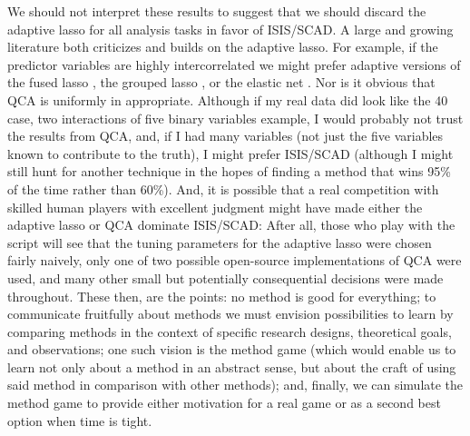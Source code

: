\documentclass[12pt]{article}
\begin{document}
We should not interpret these results to suggest that we should discard the
adaptive lasso for all analysis tasks in favor of ISIS/SCAD.  A large and
growing literature both criticizes and builds on the adaptive lasso. For
example, if the predictor variables are highly intercorrelated we might prefer
adaptive versions of the fused lasso \cite{rinaldo2009properties}, the grouped
lasso \cite{wang2008note}, or the elastic net \cite{ghosh2007adaptive}. Nor is
it obvious that QCA is uniformly in appropriate. Although if my real data did
look like the 40 case, two interactions of five binary variables example, I
would probably not trust the results from QCA, and, if I had many variables
(not just the five variables known to contribute to the truth), I might prefer
ISIS/SCAD (although I might still hunt for another technique in the hopes of
finding a method that wins 95\% of the time rather than 60\%). And, it is
possible that a real competition with skilled human players with excellent
judgment might have made either the adaptive lasso or QCA dominate ISIS/SCAD:
After all, those who play with the script will see that the tuning parameters
for the adaptive lasso were chosen fairly naively, only one of two possible
open-source implementations of QCA were used, and many other small but
potentially consequential decisions were made throughout. These then, are the
points: no method is good for everything; to communicate fruitfully about
methods we must envision possibilities to learn by comparing methods in the
context of specific research designs, theoretical goals, and observations; 
one such vision is the method game (which would enable us to learn not only
about a method in an abstract sense, but about the craft of using said
method in comparison with other methods); and, finally, we can simulate the
method game to provide either motivation for a real game or as a second best
option when time is tight. 





\end{document}
